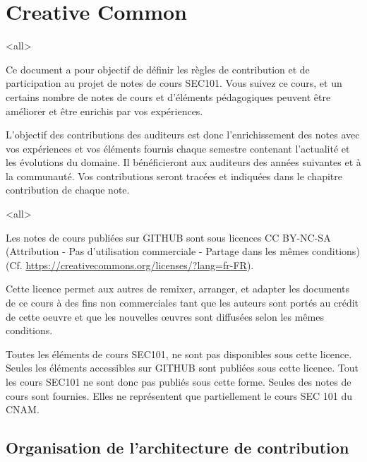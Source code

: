 
%

\section{Creative Common}

\mode<all>{
{
Ce document a pour objectif de définir les règles de contribution et de participation au projet de notes de cours SEC101. Vous suivez ce cours, et un certains nombre de notes de cours et d'éléments pédagogiques peuvent être améliorer et être enrichis par vos expériences.

L'objectif des contributions des auditeurs est donc l'enrichissement des notes avec vos expériences et vos éléments fournis chaque semestre contenant l'actualité et les évolutions du domaine. Il bénéficieront aux auditeurs des années suivantes et à la communauté. Vos contributions seront tracées et indiquées dans le chapitre contribution de chaque note. 

}} %

\mode<all>{
{
Les notes de cours publiées sur GITHUB sont sous licences CC BY-NC-SA (Attribution - Pas d’utilisation commerciale - Partage dans les mêmes conditions)(Cf. \url{https://creativecommons.org/licenses/?lang=fr-FR}).

Cette licence permet aux autres de remixer, arranger, et adapter les documents de ce cours à des fins non commerciales tant que les auteurs sont portés au crédit de cette oeuvre et que les nouvelles œuvres sont diffusées selon les mêmes conditions.
}} %

Toutes les éléments de cours SEC101, ne sont pas disponibles sous cette licence. Seules les éléments accessibles sur GITHUB sont publiées sous cette licence. Tout les cours SEC101 ne sont donc pas publiés sous cette forme. Seules des notes de cours sont fournies.  Elles ne représentent que partiellement le cours SEC 101 du CNAM.



\subsection{Organisation de l'architecture de contribution}

